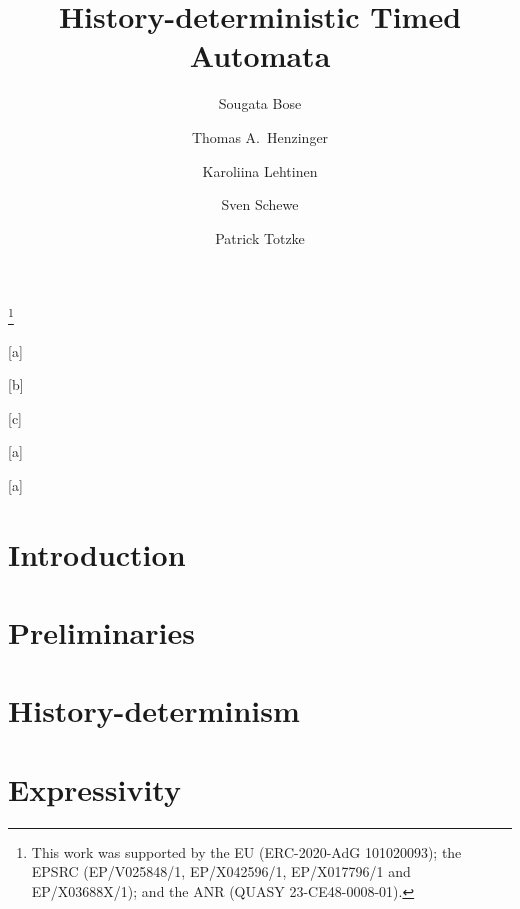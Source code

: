 \documentclass{lmcs} %
\begin{document}
	
	\title{History-deterministic Timed Automata\rsuper*}
	\thanks{
		This work was supported by the EU (ERC-2020-AdG 101020093); the EPSRC (EP/V025848/1,  EP/X042596/1, EP/X017796/1 and EP/X03688X/1); and the ANR (QUASY 23-CE48-0008-01).
	}%
	
	
	\author[S.~Bose]{Sougata Bose}[a]
	\author[T.A.~Henzinger]{Thomas A.~Henzinger}[b]
	\author[K.~Lehtinen]{Karoliina Lehtinen}[c]
	\author[S.~Schewe]{Sven Schewe}[a]
	\author[P.~Totzke]{Patrick Totzke}[a]
	
	
	\address{University of Liverpool}	%
	
	\address{IST Austria}
	
	\address{CNRS, Aix-Marseille University, LIS}
	
	
	
	
	
	\begin{abstract}
		
	\end{abstract}
	
	\maketitle
	
	
	\section{Introduction}
	\label{sec:intro}
	
	
	\section{Preliminaries}
	\label{sec:definitions}
	
	
	\section{History-determinism}
	\label{sec:gfg}
	
	
	
	\section{Expressivity}
	\label{sec:expressivity}
	
	
\end{document}
